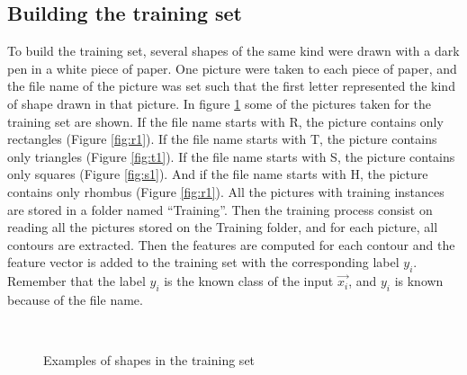 \documentclass[10pt,journal]{IEEEtran}
\begin{document}
	\subsection{Building the training set}
	To build the training set, several shapes of the same kind were drawn with a
	dark pen in a white	piece of paper. One picture were taken to each piece of
	paper, and the file name of the picture was set such that the first letter
	represented the kind of shape drawn in that picture. \newline
	In figure \ref{fig:training} some of the pictures taken for the training set 
	are shown. If the file name starts with R, the picture contains only rectangles
	(Figure \ref{fig:r1}). If the file name starts with T, the picture contains only triangles
	(Figure \ref{fig:t1}). If the file name starts with S, the picture contains only squares
	(Figure \ref{fig:s1}). And if the file name starts with H, the picture contains only rhombus
	(Figure \ref{fig:r1}).\newline
	All the pictures with training instances are stored in a folder named ``Training''.
	Then the training process consist on reading all the pictures stored on the Training
	folder, and for each picture, all contours are extracted. Then the features are
	computed for each contour and the feature vector is added to the training set with
	the corresponding label $y_i$. Remember that the label $y_i$ is the known class of the
	input $\vec{x_i}$, and $y_i$ is known because of the file name.
		
	\begin{figure}
	\centering
		\\
	\caption{Examples of shapes in the training set}
	\label{fig:training}
	\end{figure}
	
\end{document}
